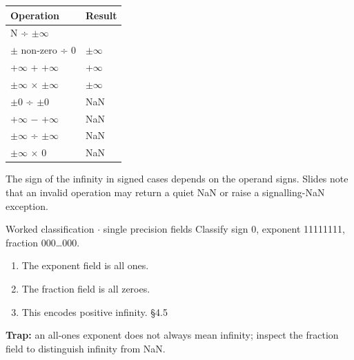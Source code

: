 \documentclass[11pt]{article}
\begin{document}
\begin{keepsection}
\begin{keepsection}
\begin{center}\small\begin{tabularx}{\linewidth}{>{\raggedright\arraybackslash}X>{\raggedright\arraybackslash}X}\toprule
\textbf{Operation} & \textbf{Result} \\ \midrule
N ÷ \ensuremath{\pm}\ensuremath{\infty} & 0 \\
\ensuremath{\pm} non-zero ÷ 0 & \ensuremath{\pm}\ensuremath{\infty} \\
+\ensuremath{\infty} + +\ensuremath{\infty} & +\ensuremath{\infty} \\
\ensuremath{\pm}\ensuremath{\infty} \ensuremath{\times} \ensuremath{\pm}\ensuremath{\infty} & \ensuremath{\pm}\ensuremath{\infty} \\
\ensuremath{\pm}0 ÷ \ensuremath{\pm}0 & NaN \\
+\ensuremath{\infty} \ensuremath{-} +\ensuremath{\infty} & NaN \\
\ensuremath{\pm}\ensuremath{\infty} ÷ \ensuremath{\pm}\ensuremath{\infty} & NaN \\
\ensuremath{\pm}\ensuremath{\infty} \ensuremath{\times} 0 & NaN \\
\bottomrule\end{tabularx}\end{center}

The sign of the infinity in signed cases depends on the operand signs. Slides note that an invalid operation may return a quiet NaN or raise a signalling-NaN exception.

\begin{workedbox}{Worked classification \ensuremath{\cdot} single precision fields}
Classify sign 0, exponent 11111111, fraction 000…000.

\begin{enumerate}
\item The exponent field is all ones.
\item The fraction field is all zeroes.
\item This encodes positive infinity. \hfill{\small\color{FAUblue}§4.5}
\end{enumerate}
\end{workedbox}

\begin{notebox}\textbf{Trap:} an all-ones exponent does not always mean infinity; inspect the fraction field to distinguish infinity from NaN.\end{notebox}
\end{keepsection}


\end{keepsection}
\end{document}
